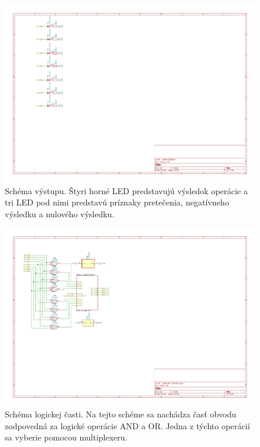 \documentclass{article}
\begin{document}
    \begin{figure}[h!]
        \centering
        \includegraphics[width=.8\linewidth]{output_sheet.pdf}
        \caption{Schéma výstupu. Štyri horné LED predstavujú výsledok operácie a tri LED pod nimi predstavú príznaky pretečenia, negatívneho výsledku a nulového výsledku.}
    \end{figure}


    \begin{figure}[h!]
        \centering
        \includegraphics[width=.8\linewidth]{logic_sheet.pdf}
        \caption{Schéma logickej časti. Na tejto schéme sa nachádza časť obvodu zodpovedná za logické operácie AND a OR. Jedna z týchto operácií sa vyberie pomocou multiplexeru.}
    \end{figure}
\end{document}
